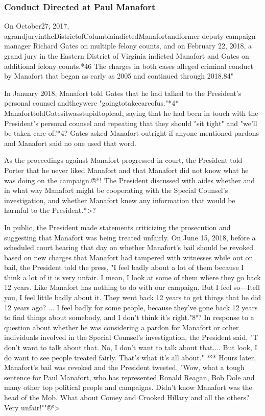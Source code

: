 \subsubsection{Conduct Directed at Paul Manafort}

On October27, 2017, agrandjuryintheDistrictofColumbiaindictedManafortandformer deputy campaign manager Richard Gates on multiple felony counts, and on February 22, 2018, a grand jury in the Eastern District of Virginia indicted Manafort and Gates on additional felony counts.*46
The charges in both cases alleged criminal conduct by Manafort that began as early as 2005 and continued through 2018.84"

In January 2018, Manafort told Gates that he had talked to the President's personal counsel andtheywere "goingtotakecareofus."*4*
ManaforttoldGatesitwasstupidtoplead, saying that he had been in touch with the President's personal counsel and repeating that they should "sit tight" and "we'll be taken care of.'*4?
Gates asked Manafort outright if anyone mentioned pardons and Manafort said no one used that word.

As the proceedings against Manafort progressed in court, the President told Porter that he never liked Manafort and that Manafort did not know what he was doing on the campaign.®*!
The President discussed with aides whether and in what way Manafort might be cooperating with the Special Counsel's investigation, and whether Manafort knew any information that would be harmful to the President.*>?

In public, the President made statements criticizing the prosecution and suggesting that Manafort was being treated unfairly.
On June 15, 2018, before a scheduled court hearing that day on whether Manafort's bail should be revoked based on new charges that Manafort had tampered with witnesses while out on bail, the President told the press, "I feel badly about a lot of them because I think a lot of it is very unfair.
I mean, I look at some of them where they go back 12 years.
Like Manafort has nothing to do with our campaign.
But I feel so—Itell you, I feel little badly about it.
They went back 12 years to get things that he did 12 years ago? ...
I feel badly for some people, because they've gone back 12 years to find things about somebody, and I don't think it's right."8°?
In response to a question about whether he was considering a pardon for Manafort or other individuals involved in the Special Counsel's investigation, the President said, "T don't want to talk about that.
No, I don't want to talk about that....
But look, I do want to see people treated fairly.
That's what it's all about." *°*
Hours later, Manafort's bail was revoked and the President tweeted, "Wow, what a tough sentence for Paul Manafort, who has represented Ronald Reagan, Bob Dole and many other top political people and campaigns.
Didn't know Manafort was the head of the Mob.
What about Comey and Crooked Hillary and all the others? Very unfair!""®°>

